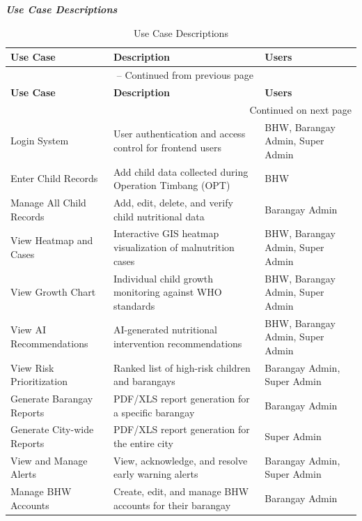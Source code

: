 \documentclass[12pt, a4paper]{report}
\begin{document}
\noindent \textbf{\textit{Use Case Descriptions}}

\vspace{0.3cm}
\begin{longtable}{p{3.5cm} p{7cm} p{4cm}}
    \caption{Use Case Descriptions} \label{tab:usecase_desc} \\
    \toprule
    \textbf{Use Case} & \textbf{Description} & \textbf{Users} \\
    \midrule
    \endfirsthead
    \multicolumn{3}{c}{{\tablename\ \thetable{} -- Continued from previous page}} \\
    \toprule
    \textbf{Use Case} & \textbf{Description} & \textbf{Users} \\
    \midrule
    \endhead
    \midrule
    \multicolumn{3}{r}{{Continued on next page}} \\
    \endfoot
    \bottomrule
    \endlastfoot
    Login System & User authentication and access control for frontend users & BHW, Barangay Admin, Super Admin \\
    \addlinespace
    Enter Child Records & Add child data collected during Operation Timbang (OPT) & BHW \\
    \addlinespace
    Manage All Child Records & Add, edit, delete, and verify child nutritional data & Barangay Admin \\
    \addlinespace
    View Heatmap and Cases & Interactive GIS heatmap visualization of malnutrition cases & BHW, Barangay Admin, Super Admin \\
    \addlinespace
    View Growth Chart & Individual child growth monitoring against WHO standards & BHW, Barangay Admin, Super Admin \\
    \addlinespace
    View AI Recommendations & AI-generated nutritional intervention recommendations & BHW, Barangay Admin, Super Admin \\
    \addlinespace
    View Risk Prioritization & Ranked list of high-risk children and barangays & Barangay Admin, Super Admin \\
    \addlinespace
    Generate Barangay Reports & PDF/XLS report generation for a specific barangay & Barangay Admin \\
    \addlinespace
    Generate City-wide Reports & PDF/XLS report generation for the entire city & Super Admin \\
    \addlinespace
    View and Manage Alerts & View, acknowledge, and resolve early warning alerts & Barangay Admin, Super Admin \\
    \addlinespace
    Manage BHW Accounts & Create, edit, and manage BHW accounts for their barangay & Barangay Admin \\

\end{longtable}
\end{document}
